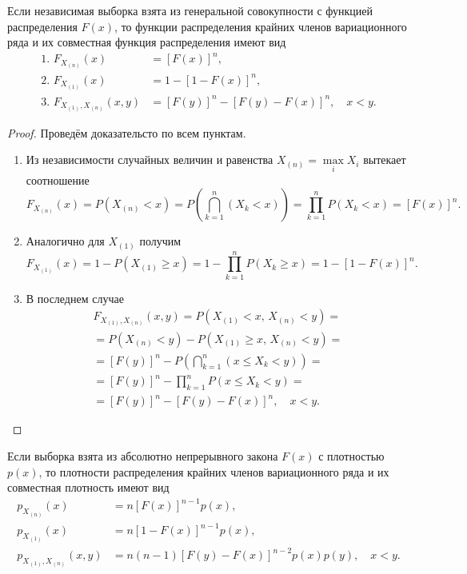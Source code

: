 \begin{theorem}
	Если независимая выборка взята из генеральной совокупности с
функцией распределения $F(x)$, то функции распределения крайних членов
вариационного ряда и их совместная функция распределения имеют вид 
\begin{align*}
	\text{1. }F_{X_{(n)}}(x) &= [F(x)]^n,\\
	\text{2. }F_{X_{(1)}}(x) &= 1 - [1 - F(x)]^n,\\
	\text{3. }F_{X_{(1)}, X_{(n)}} (x, y) &= [F(y)]^n - [F(y)-F(x)]^n, \quad x < y.
\end{align*}
\end{theorem}
\begin{proof} Проведём доказательсто по всем пунктам.
	\begin{enumerate}
		\item Из независимости случайных величин и равенства $ X_{(n)} = \max\limits_i X_i $ вытекает соотношение
	\[
		F_{X_{(n)}}(x) = P \left( X_{(n)} < x \right) = P \left( \bigcap_{k=1}^n (X_k <
		x)\right) = \prod_{k=1}^n P(X_k < x) = [F(x)]^n.
	\]
\item Аналогично для $ X_{(1)} $ получим 
\[
	F_{X_{(1)}}(x) = 1 - P(X_{(1)} \geqslant x) = 1 - \prod_{k=1}^n P(X_k \geqslant
	x) = 1 - [1- F(x)]^n.
\]
\item В последнем случае 
\begin{multline*}
	F_{X_{(1)}, X_{(n)}}(x,y) = P(X_{(1)} < x, \, X_{(n)} < y) = \\ = P(X_{(n)} < y ) -
	P\left(X_{(1)} \geqslant x, \, X_{(n)} < y \right) = \\ =
	[F(y)]^n - P \left( \bigcap_{k=1}^n (x \leqslant X_k < y ) \right)  = \\ =
	[F(y)]^n - \prod_{k=1}^n P(x \leqslant X_k < y) = \\ =
	[F(y)]^n - [F(y) - F(x)]^n, \quad x < y.
\end{multline*}
\end{enumerate}
\end{proof}
\begin{corollary*}
	Если выборка взята из абсолютно непрерывного закона $F(x)$ с 
плотностью $p(x)$, то плотности распределения крайних членов вариационного ряда и их 
совместная плотность имеют вид 
\begin{align*}
	p_{X_{(n)}}(x) &= n[F(x)]^{n-1}p(x),\\
	p_{X_{(1)}}(x) &= n[1-F(x)]^{n-1}p(x),\\
	p_{X_{(1)}, X_{(n)}}(x, y) &= n(n-1)[F(y)-F(x)]^{n-2}p(x)p(y), \quad x < y.
\end{align*} %
\end{corollary*}

